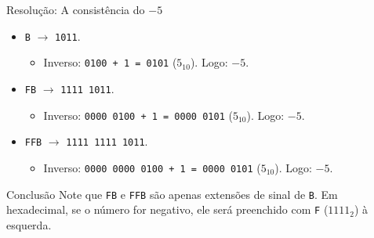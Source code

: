 \begin{frame}{Resolução: A consistência do $-5$}
    \small
    \begin{itemize}
        \item[\textbf{a)}] \texttt{B} $\rightarrow$ \texttt{1011}.
              \begin{itemize}
                  \item Inverso: \texttt{0100 + 1 = 0101} ($5_{10}$). Logo: \textbf{$-5$}.
              \end{itemize}
        \item[\textbf{b)}] \texttt{FB} $\rightarrow$ \texttt{1111 1011}.
              \begin{itemize}
                  \item Inverso: \texttt{0000 0100 + 1 = 0000 0101} ($5_{10}$). Logo: \textbf{$-5$}.
              \end{itemize}
        \item[\textbf{c)}] \texttt{FFB} $\rightarrow$ \texttt{1111 1111 1011}.
              \begin{itemize}
                  \item Inverso: \texttt{0000 0000 0100 + 1 = 0000 0101} ($5_{10}$). Logo: \textbf{$-5$}.
              \end{itemize}
    \end{itemize}

    \begin{alertblock}{Conclusão}
        Note que \texttt{FB} e \texttt{FFB} são apenas extensões de sinal de \texttt{B}. Em hexadecimal, se o número for negativo, ele será preenchido com \texttt{F} ($1111_2$) à esquerda.
    \end{alertblock}
\end{frame}

